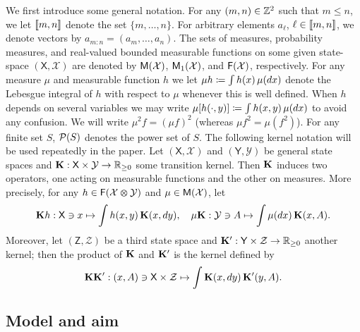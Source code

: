 We first introduce some general notation. 
For any $(m, n) \in \mathbb{Z}^2$ such that $m \leq n$, we let $\llbracket m, n \rrbracket$ denote the set $\{m, \ldots, n\}$. For arbitrary elements $a_\ell$, $\ell \in \llbracket m, n \rrbracket$, we denote vectors by $a_{m:n} = (a_m, \ldots, a_n)$. The sets of measures, probability measures, and real-valued bounded measurable functions on some given state-space $(\mathsf{X}, \mathcal{X})$ are denoted by $\mathsf{M}(\mathcal{X})$, $\mathsf{M}_1(\mathcal{X})$, and $\mathsf{F}(\mathcal{X})$, respectively. For any measure $\mu$ and measurable function $h$ we let $\mu h \coloneqq \int h(x) \, \mu(d x)$ denote the Lebesgue integral of $h$ with respect to $\mu$ whenever this is well defined. When $h$ depends on several variables we may write $\mu[h(\cdot,y)]\coloneqq \int h(x,y) \, \mu(d x)$ to avoid any confusion. We will write $\mu^2 f = (\mu f)^2$ (whereas $\mu f^2 = \mu(f^2)$). For any finite set $S$, $\mathcal{P}(S)$ denotes the power set of $S$. The following kernel notation will be used repeatedly in the paper. Let $(\mathsf{X}, \mathcal{X})$ and $(\mathsf{Y}, \mathcal{Y})$ be general state spaces and $\mathbf{K} : \mathsf{X} \times \mathcal{Y} \to \mathbb{R}_{\geq 0}$ some transition kernel. Then $\mathbf{K}$ induces two operators, one acting on measurable functions and the other on measures. More precisely, for any $h \in \mathsf{F}(\mathcal{X} \varotimes \mathcal{Y})$ and $\mu \in \mathsf{M}(\mathcal{X})$, let 
$$
\mathbf{K} h : \mathsf{X} \ni x \mapsto \int h(x, y) \, \mathbf{K}(x, d y), \quad \mu \mathbf{K} : \mathcal{Y} \ni A \mapsto \int \mu(d x) \, \mathbf{K}(x, A). 
$$ 
Moreover, let $(\mathsf{Z}, \mathcal{Z})$ be a third state space and $\mathbf{K}' : \mathsf{Y} \times \mathcal{Z} \to \mathbb{R}_{\geq 0}$ another kernel; then the product of $\mathbf{K}$ and $\mathbf{K}'$ is the kernel defined by 
$$
\mathbf{K} \mathbf{K}' : (x, A) \ni \mathsf{X} \times \mathcal{Z} \mapsto \int \mathbf{K}(x, d y) \, \mathbf{K}'(y, A). 
$$    

\subsection{Model and aim}
\label{sec:model}

